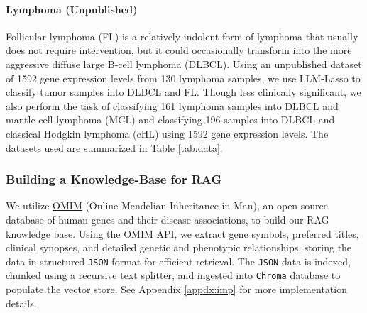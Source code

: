 \paragraph{Lymphoma (Unpublished)}
Follicular lymphoma (FL) is a relatively indolent form of lymphoma that usually does not require intervention, but it could occasionally transform into the more aggressive diffuse large B-cell lymphoma (DLBCL). Using an unpublished dataset of 1592 gene expression levels from 130 lymphoma samples, we use LLM-Lasso to classify tumor samples into DLBCL and FL. Though less clinically significant, we also perform the task of classifying 161 lymphoma samples into DLBCL and mantle cell lymphoma (MCL) and classifying 196 samples into DLBCL and classical Hodgkin lymphoma (cHL) using 1592 gene expression levels. The datasets used are summarized in Table \ref{tab:data}.


\subsubsection{Building a Knowledge-Base for RAG}\label{sec:omim-knowledge-base}
We utilize \href{https://www.omim.org/}{OMIM} (Online Mendelian Inheritance in Man), an open-source database of human genes and their disease associations, to build our RAG knowledge base. Using the OMIM API, we extract gene symbols, preferred titles, clinical synopses, and detailed genetic and phenotypic relationships, storing the data in structured \texttt{JSON} format for efficient retrieval. The \texttt{JSON} data is indexed, chunked using a recursive text splitter, and ingested into \texttt{Chroma} database to populate the vector store. See Appendix \ref{appdx:imp} for more implementation details.






